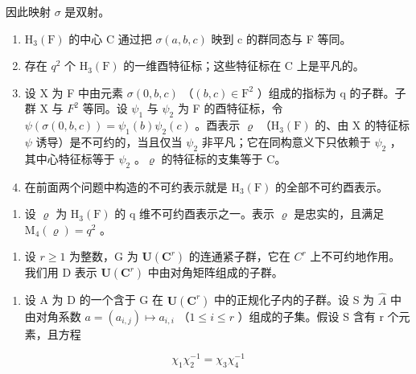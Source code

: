 因此映射 \(\sigma\) 是双射。

\begin{enumerate}
\def\labelenumi{\alph{enumi})}
\item
  \(\mathrm{H}_{3}(\mathrm{F})\) 的中心 C 通过把 \(\sigma(a,b,c)\) 映到 c 的群同态与 F 等同。
\item
  存在 \(q^{2}\) 个 \(\mathrm{H}_{3}(\mathrm{F})\) 的一维酉特征标；这些特征标在 C 上是平凡的。
\item
  设 X 为 F 中由元素 \(\sigma(0,b,c)\) （\((b,c)\in\mathrm{F}^{2}\) ）组成的指标为 q 的子群。子群 X 与 \(F^{2}\) 等同。设 \(\psi_{1}\) 与 \(\psi_{2}\) 为 F 的酉特征标，令 \(\psi(\sigma(0,b,c))=\psi_{1}(b)\psi_{2}(c)\) 。酉表示 \(\varrho\) （\(\mathrm{H}_{3}(\mathrm{F})\) 的、由 X 的特征标 \(\psi\) 诱导）是不可约的，当且仅当 \(\psi_{2}\) 非平凡；它在同构意义下只依赖于 \(\psi_{2}\) ，其中心特征标等于 \(\psi_{2}\) 。\(\varrho\) 的特征标的支集等于 C。
\item
  在前面两个问题中构造的不可约表示就是 \(\mathrm{H}_{3}(\mathrm{F})\) 的全部不可约酉表示。
\end{enumerate}

\begin{enumerate}
\def\labelenumi{\alph{enumi})}
\setcounter{enumi}{4}
\tightlist
\item
  设 \(\varrho\) 为 \(\mathrm{H}_{3}(\mathrm{F})\) 的 q 维不可约酉表示之一。表示 \(\varrho\) 是忠实的，且满足 \(\mathrm{M}_{4}(\varrho)=q^{2}\) 。
\end{enumerate}

\begin{enumerate}
\def\labelenumi{\arabic{enumi})}
\setcounter{enumi}{15}
\tightlist
\item
  设 \(r \geqslant 1\) 为整数，G 为 \(\mathbf{U}(\mathbf{C}^{r})\) 的连通紧子群，它在 \(C^{r}\) 上不可约地作用。我们用 D 表示 \(\mathbf{U}(\mathbf{C}^{r})\) 中由对角矩阵组成的子群。
\end{enumerate}

\begin{enumerate}
\def\labelenumi{\alph{enumi})}
\tightlist
\item
  设 A 为 D 的一个含于 G 在 \(\mathbf{U}(\mathbf{C}^{r})\) 中的正规化子内的子群。设 S 为 \(\widehat{A}\) 中由对角系数 \(a = (a_{i,j}) \mapsto a_{i,i}\) （\(1 \leqslant i \leqslant r\) ）组成的子集。假设 S 含有 r 个元素，且方程
\end{enumerate}

\[
\chi_ {1} \chi_ {2} ^ {- 1} = \chi_ {3} \chi_ {4} ^ {- 1}
\]

